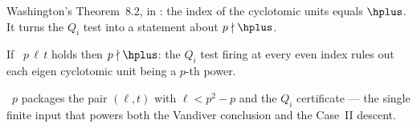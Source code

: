 \begin{definition}[Unit index {$[E:C]=\hplus$} (external)]\label{ext:unitindex}
  \leanok
  Washington's Theorem~8.2,  in
  : the index of the cyclotomic units equals $\hplus$. It
  turns the $Q_i$ test into a statement about $p \nmid \hplus$.
\end{definition}

\begin{theorem}\label{thm:vbridge}
  \leanok
  If ~$p\,\ell\,t$ holds then $p \nmid \hplus$: the $Q_i$ test
  firing at every even index rules out each eigen cyclotomic unit being a $p$-th
  power.
\end{theorem}

\begin{definition}\label{def:swcert}
  \leanok
  ~$p$ packages the pair $(\ell, t)$ with $\ell < p^2-p$ and
  the $Q_i$ certificate --- the single finite input that powers both the Vandiver
  conclusion and the Case~II descent.
\end{definition}
